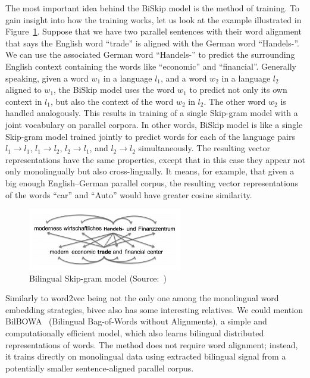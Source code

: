 The most important idea behind the BiSkip model is the method of training. To gain insight into how the training works, let us look at the example illustrated in Figure~\ref{figure:bivec_bsg}. Suppose that we have two parallel sentences with their word alignment that says the English word ``trade'' is aligned with the German word ``Handels-''. We can use the associated German word ``Handels-'' to predict the surrounding English context containing the words like ``economic'' and ``financial''. Generally speaking, given a word $w_1$ in a language $l_1$, and a word $w_2$ in a language $l_2$ aligned to $w_1$, the BiSkip model uses the word $w_1$ to predict not only its own context in $l_1$, but also the context of the word $w_2$ in $l_2$. The other word $w_2$ is handled analogously. This results in training of a single Skip-gram model with a joint vocabulary on parallel corpora. In other words, BiSkip model is like a single Skip-gram model trained jointly to predict words for each of the language pairs $l_1 \rightarrow l_1$, $l_1 \rightarrow l_2$, $l_2 \rightarrow l_1$, and $l_2 \rightarrow l_2$ simultaneously. The resulting vector representations have the same properties, except that in this case they appear not only monolingually but also cross-lingually. It means, for example, that given a big enough English--German parallel corpus, the resulting vector representations of the words ``car'' and ``Auto'' would have greater cosine similarity.

\begin{figure}[!htb]
	\centering
	\caption{Bilingual Skip-gram model (Source:~\cite{Luong15})}
	\label{figure:bivec_bsg}
	\vspace{1em}
	\includegraphics[width=0.6\textwidth]{images/bivec_bsg.png}
\end{figure}

Similarly to word2vec being not the only one among the monolingual word embedding strategies, bivec also has some interesting relatives. We could mention BilBOWA~\cite{Gouws14} (Bilingual Bag-of-Words without Alignments), a simple and computationally efficient model, which also learns bilingual distributed representations of words. The method does not require word alignment; instead, it trains directly on monolingual data using extracted bilingual signal from a potentially smaller sentence-aligned parallel corpus.


